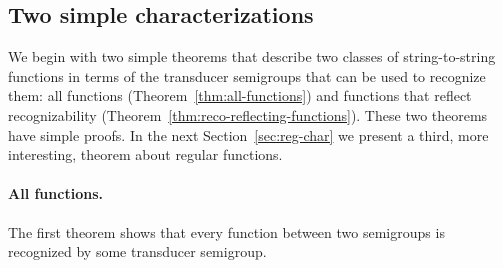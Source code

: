



\subsection{Two simple characterizations}
We begin with two simple theorems that describe two classes of string-to-string functions in terms of the transducer semigroups that can be used to recognize them: all functions (Theorem~\ref{thm:all-functions}) and functions that reflect recognizability (Theorem~\ref{thm:reco-reflecting-functions}). These two theorems have simple proofs. In the next Section~\ref{sec:reg-char} we present a third, more  interesting, theorem about  regular functions.

\paragraph*{All functions.} The first theorem shows that every function between two semigroups is recognized by some transducer semigroup.

